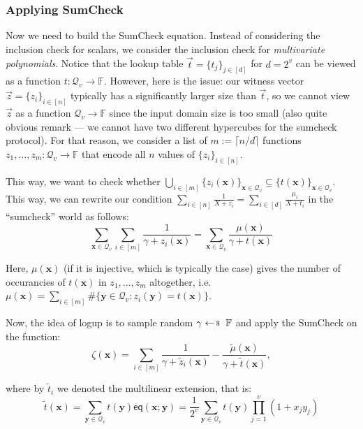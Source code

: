 \subsubsection{Applying SumCheck}

Now we need to build the SumCheck equation. Instead of considering the inclusion
check for scalars, we consider the inclusion check for \textit{multivariate
polynomials}. Notice that the lookup table $\vec{t} = \{t_j\}_{j \in [d]}$ for
$d=2^v$ can be viewed as a function $t: \mathcal{Q}_v \to \mathbb{F}$. However,
here is the issue: our witness vector $\vec{z} = \{z_i\}_{i \in [n]}$ typically
has a significantly larger size than $\vec{t}$, so we cannot view $\vec{z}$ as a
function $\mathcal{Q}_v \to \mathbb{F}$ since the input domain size is too small
(also quite obvious remark --- we cannot have two different hypercubes for the
sumcheck protocol). For that reason, we consider a list of $m := \lceil n/d
\rceil$ functions $z_1,\dots,z_m: \mathcal{Q}_v \to \mathbb{F}$ that encode all
$n$ values of $\{z_i\}_{i \in [n]}$.

This way, we want to check whether $\bigcup_{i \in
[m]}\{z_i(\mathbf{x})\}_{\mathbf{x} \in \mathcal{Q}_v} \subseteq
\{t(\mathbf{x})\}_{\mathbf{x} \in \mathcal{Q}_v}$. This way, we can rewrite our
condition $\sum_{i \in [n]} \frac{1}{X+z_i} = \sum_{i \in [d]}
\frac{\mu_i}{X+t_i}$ in the ``sumcheck'' world as follows:
\begin{equation*}
    \sum_{\mathbf{x} \in \mathcal{Q}_v}\sum_{i \in [m]} \frac{1}{\gamma + z_i(\mathbf{x})} = \sum_{\mathbf{x} \in \mathcal{Q}_v} \frac{\mu(\mathbf{x})}{\gamma + t(\mathbf{x})}
\end{equation*}

Here, $\mu(\mathbf{x})$ (if it is injective, which is typically the case) gives the
number of occurancies of $t(\mathbf{x})$ in $z_1,\dots,z_m$ altogether, i.e.
$\mu(\mathbf{x}) = \sum_{i \in [m]}\#\{\mathbf{y} \in \mathcal{Q}_v:
z_i(\mathbf{y}) = t(\mathbf{x})\}$.

Now, the idea of logup is to sample random $\gamma \leftarrowS \mathbb{F}$ and 
apply the SumCheck on the function:
\begin{equation*}
    \zeta(\mathbf{x}) = \sum_{i \in [m]} \frac{1}{\gamma + \widetilde{z}_i(\mathbf{x})} - \frac{\widetilde{\mu}(\mathbf{x})}{\gamma + \widetilde{t}(\mathbf{x})},
\end{equation*}

where by $\widetilde{t}_i$ we denoted the multilinear extension, that is:
\begin{equation*}
\widetilde{t}(\mathbf{x}) = \sum_{\mathbf{y} \in \mathcal{Q}_v}
t(\mathbf{y})\mathsf{eq}(\mathbf{x}; \mathbf{y}) = \frac{1}{2^v}\sum_{\mathbf{y} \in \mathcal{Q}_v}t(\mathbf{y})\prod_{j=1}^v(1+x_jy_j) 
\end{equation*}

